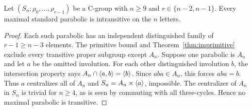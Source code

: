 \begin{corollary}\label{cor:intransitive}
Let $(S_n;\rho_0,\ldots,\rho_{r-1})$ be a C-group with
$n\geq9$ and $r\in\{n-2,n-1\}$. Every maximal standard
parabolic is intransitive on the $n$ letters.
\end{corollary}
\begin{proof}
Each such parabolic has an independent distinguished family of
$r-1\geq n-3$ elements. The primitive bound and
Theorem~\ref{thm:imprimitive} exclude every transitive proper
subgroup except $A_n$. Suppose one parabolic is $A_n$ and let
$a$ be the omitted involution. For each other distinguished
involution $b$, the intersection property says
$A_n\cap\langle a,b\rangle=\langle b\rangle$. Since $aba\in A_n$, this forces
$aba=b$. Thus $a$ centralizes all of $A_n$ and
$S_n=A_n\times\langle a\rangle$, impossible. The centralizer of $A_n$
in $S_n$ is trivial for $n\geq4$, as is seen by commuting with
all three-cycles. Hence no maximal parabolic is transitive.
\end{proof}

